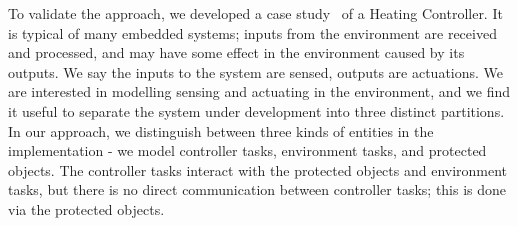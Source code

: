 To validate the approach, we developed a case study~\cite{CGTutorial} of a Heating Controller. It is typical of many embedded systems; inputs from the environment are received and processed, and may have some effect in the environment caused by its outputs. We say the inputs to the system are sensed, outputs are actuations. We are interested in modelling sensing and actuating in the environment, and we find it useful to separate the system under development into three distinct partitions. In our approach, we distinguish between three kinds of entities in the implementation - we model controller tasks, environment tasks, and protected objects. The controller tasks interact with the protected objects and environment tasks, but there is no direct communication between controller tasks; this is done via the protected objects.
%
